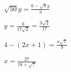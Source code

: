 \documentclass{ximera}
\begin{document}
\begin{question}
\begin{problem}
$\sqrt{50} y = \frac{6 - \sqrt{8} y}{3}$

\begin{solution}
 $y = \frac{6}{17\sqrt{2}}  = \frac{3 \sqrt{2}}{17}$
 \end{solution}
\end{problem}

\begin{problem} \label{lineareqlast}
$4 - (2x+1) = \frac{x \sqrt{7}}{9}$ 

\begin{solution}
 $x = \frac{27}{18+\sqrt{7}}$
\end{solution}
\end{problem}

\end{question}
\end{document}
